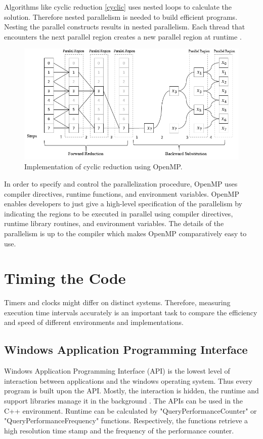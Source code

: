 \documentclass[12pt, oneside]{book}
\theoremstyle{plain}
\theoremstyle{definition}
\begin{document}
Algorithms like cyclic reduction \ref{cyclic} uses nested loops to calculate the solution. Therefore nested parallelism is needed to build efficient programs. Nesting the parallel constructs results in nested parallelism. Each thread that encounters the next parallel region creates a new parallel region at runtime \cite{openmpnext}.

\begin{figure}[!htb]
    \centering
        \includegraphics[scale=0.5]{cyclicopenmp.png}
    \caption{Implementation of cyclic reduction using OpenMP.}
\end{figure}

In order to specify and control the parallelization procedure, OpenMP uses compiler directives, runtime functions, and  environment variables. OpenMP enables developers to just give a high-level specification of the parallelism by indicating the regions to be executed in parallel using compiler directives, runtime library routines, and environment variables. The details of the parallelism is up to the compiler which makes OpenMP comparatively easy to use. 

\section{Timing the Code}
Timers and clocks might differ on distinct systems. Therefore, measuring execution time intervals accurately is an important task to compare the efficiency and speed of different environments and implementations. 

\subsection{Windows Application Programming Interface}
Windows Application Programming Interface (API) is the lowest level of interaction between applications and the windows operating system. Thus every program is built upon  the API. Mostly, the interaction is hidden, the runtime and support libraries manage it in the background \cite{windows}. The APIs can be used in the C++ environment. Runtime can be calculated by "QueryPerformanceCounter" or "QueryPerformanceFrequency"  functions. Respectively, the functions retrieve a high resolution time stamp and the frequency of the performance counter. 
\end{document}
